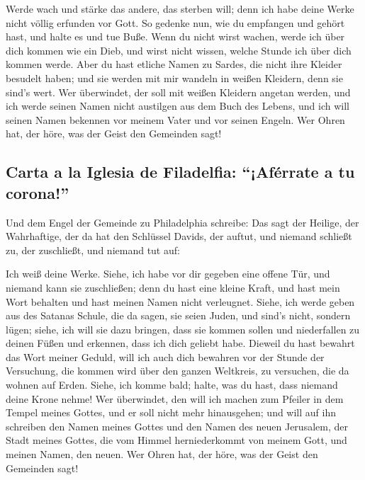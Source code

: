  Werde wach und stärke das andere, das sterben will; denn
ich habe deine Werke nicht völlig erfunden vor Gott.  So
gedenke nun, wie du empfangen und gehört hast, und halte es und tue
Buße. Wenn du nicht wirst wachen, werde ich über dich kommen wie ein
Dieb, und wirst nicht wissen, welche Stunde ich über dich kommen werde.
 Aber du hast etliche Namen zu Sardes, die nicht ihre
Kleider besudelt haben; und sie werden mit mir wandeln in weißen
Kleidern, denn sie sind's wert.  Wer überwindet, der soll
mit weißen Kleidern angetan werden, und ich werde seinen Namen nicht
austilgen aus dem Buch des Lebens, und ich will seinen Namen bekennen
vor meinem Vater und vor seinen Engeln.  Wer Ohren hat,
der höre, was der Geist den Gemeinden sagt!

\hypertarget{carta-a-la-iglesia-de-filadelfia-afuxe9rrate-a-tu-corona}{%
\subsection{Carta a la Iglesia de Filadelfia: ``¡Aférrate a tu
corona!''}\label{carta-a-la-iglesia-de-filadelfia-afuxe9rrate-a-tu-corona}}

 Und dem Engel der Gemeinde zu Philadelphia schreibe: Das
sagt der Heilige, der Wahrhaftige, der da hat den Schlüssel Davids, der
auftut, und niemand schließt zu, der zuschließt, und niemand tut auf:

 Ich weiß deine Werke. Siehe, ich habe vor dir gegeben
eine offene Tür, und niemand kann sie zuschließen; denn du hast eine
kleine Kraft, und hast mein Wort behalten und hast meinen Namen nicht
verleugnet.  Siehe, ich werde geben aus des Satanas
Schule, die da sagen, sie seien Juden, und sind's nicht, sondern lügen;
siehe, ich will sie dazu bringen, dass sie kommen sollen und
niederfallen zu deinen Füßen und erkennen, dass ich dich geliebt habe.
 Dieweil du hast bewahrt das Wort meiner Geduld, will ich
auch dich bewahren vor der Stunde der Versuchung, die kommen wird über
den ganzen Weltkreis, zu versuchen, die da wohnen auf Erden.
 Siehe, ich komme bald; halte, was du hast, dass niemand
deine Krone nehme!  Wer überwindet, den will ich machen
zum Pfeiler in dem Tempel meines Gottes, und er soll nicht mehr
hinausgehen; und will auf ihn schreiben den Namen meines Gottes und den
Namen des neuen Jerusalem, der Stadt meines Gottes, die vom Himmel
herniederkommt von meinem Gott, und meinen Namen, den neuen.
 Wer Ohren hat, der höre, was der Geist den Gemeinden
sagt!

